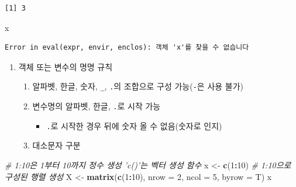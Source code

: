 \documentclass[11pt,a4paper]{book}
\newenvironment{Shaded}{\begin{snugshade}}{\end{snugshade}}
\newcommand{\KeywordTok}[1]{\textcolor[rgb]{0.13,0.29,0.53}{\textbf{#1}}}
\newcommand{\DataTypeTok}[1]{\textcolor[rgb]{0.13,0.29,0.53}{#1}}
\newcommand{\DecValTok}[1]{\textcolor[rgb]{0.00,0.00,0.81}{#1}}
\newcommand{\StringTok}[1]{\textcolor[rgb]{0.31,0.60,0.02}{#1}}
\newcommand{\CommentTok}[1]{\textcolor[rgb]{0.56,0.35,0.01}{\textit{#1}}}
\newcommand{\OperatorTok}[1]{\textcolor[rgb]{0.81,0.36,0.00}{\textbf{#1}}}
\newcommand{\NormalTok}[1]{#1}
\providecommand{\tightlist}{%
  \setlength{\itemsep}{0pt}\setlength{\parskip}{0pt}}
\theoremstyle{definition}
\theoremstyle{definition}
\theoremstyle{definition}
\theoremstyle{remark}
\begin{document}
\begin{verbatim}
[1] 3
\end{verbatim}

\begin{Shaded}
\begin{Highlighting}[]
\NormalTok{x}
\end{Highlighting}
\end{Shaded}

\begin{verbatim}
Error in eval(expr, envir, enclos): 객체 'x'를 찾을 수 없습니다
\end{verbatim}

\normalsize

\begin{enumerate}
\def\labelenumi{\arabic{enumi}.}
\setcounter{enumi}{1}
\tightlist
\item
  객체 또는 변수의 명명 규칙

  \begin{enumerate}
  \def\labelenumii{\arabic{enumii})}
  \tightlist
  \item
    알파벳, 한글, 숫자, \texttt{\_}, \texttt{.}의 조합으로 구성
    가능(\texttt{-}은 사용 불가)
  \item
    변수명의 알파벳, 한글, \texttt{.}로 시작 가능

    \begin{itemize}
    \tightlist
    \item
      \texttt{.}로 시작한 경우 뒤에 숫자 올 수 없음(숫자로 인지)
    \end{itemize}
  \item
    대소문자 구분 \footnotesize
  \end{enumerate}
\end{enumerate}

\begin{Shaded}
\begin{Highlighting}[]
\CommentTok{# 1:10은 1부터 10까지 정수 생성 'c()'는 벡터 생성 함수}
\NormalTok{x <-}\StringTok{ }\KeywordTok{c}\NormalTok{(}\DecValTok{1}\OperatorTok{:}\DecValTok{10}\NormalTok{)}
\CommentTok{# 1:10으로 구성된 행렬 생성}
\NormalTok{X <-}\StringTok{ }\KeywordTok{matrix}\NormalTok{(}\KeywordTok{c}\NormalTok{(}\DecValTok{1}\OperatorTok{:}\DecValTok{10}\NormalTok{), }\DataTypeTok{nrow =} \DecValTok{2}\NormalTok{, }\DataTypeTok{ncol =} \DecValTok{5}\NormalTok{, }\DataTypeTok{byrow =}\NormalTok{ T)}
\NormalTok{x}
\end{Highlighting}
\end{Shaded}
\end{document}
